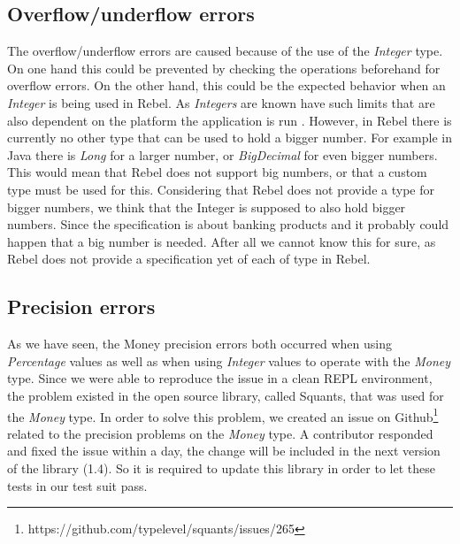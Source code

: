 \subsection*{Overflow/underflow errors}
The overflow/underflow errors are caused because of the use of the \textit{Integer} type. On one hand this could be prevented by checking the operations beforehand for overflow errors. On the other hand, this could be the expected behavior when an \textit{Integer} is being used in Rebel. As \textit{Integers} are known have such limits that are also dependent on the platform the application is run . However, in Rebel there is currently no other type that can be used to hold a bigger number. For example in Java there is \textit{Long} for a larger number, or \textit{BigDecimal} for even bigger numbers. This would mean that Rebel does not support big numbers, or that a custom type must be used for this. Considering that Rebel does not provide a type for bigger numbers, we think that the Integer is supposed to also hold bigger numbers. Since the specification is about banking products and it probably could happen that a big number is needed. After all we cannot know this for sure, as Rebel does not provide a specification yet of each of type in Rebel.

\subsection*{Precision errors}
As we have seen, the Money precision errors both occurred when using \textit{Percentage} values as well as when using \textit{Integer} values to operate with the \textit{Money} type. Since we were able to reproduce the issue in a clean REPL environment, the problem existed in the open source library, called Squants, that was used for the \textit{Money} type. In order to solve this problem, we created an issue on Github\footnote{https://github.com/typelevel/squants/issues/265} related to the precision problems on the \textit{Money} type. A contributor responded and fixed the issue within a day, the change will be included in the next version of the library (1.4). So it is required to update this library in order to let these tests in our test suit pass.





